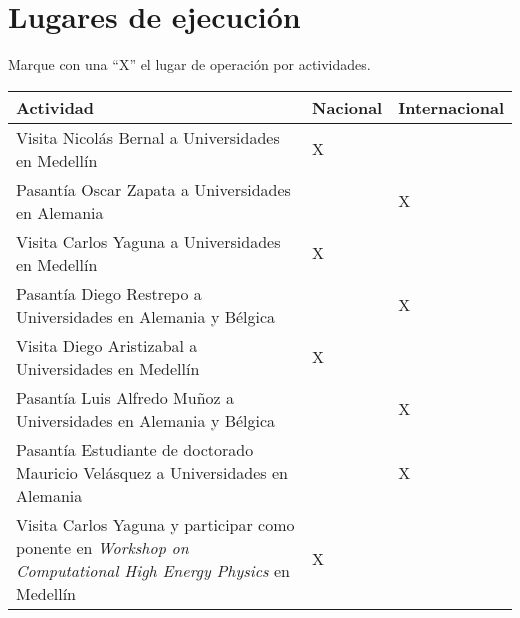 
\section{Lugares de ejecución}
\begin{instrucciones}
Marque con una “X” el lugar de operación por actividades.  
\end{instrucciones}

\begin{tabular}{|p{10cm}|l|l|}\hline
  Actividad                           & Nacional & Internacional \\\hline
Visita Nicolás Bernal a Universidades 
en Medellín                           & X        &               \\\hline
Pasantía Oscar Zapata a Universidades 
en Alemania                           &          & X             \\\hline
Visita Carlos Yaguna a Universidades 
en Medellín                           & X        &               \\\hline
Pasantía Diego Restrepo a Universidades 
en Alemania y Bélgica                 &          & X             \\\hline
Visita Diego Aristizabal a Universidades 
en Medellín                           & X        &               \\\hline
Pasantía Luis Alfredo Muñoz a Universidades 
en Alemania y Bélgica                 &          & X             \\\hline
Pasantía Estudiante de doctorado  
Mauricio Velásquez a Universidades 
en Alemania                           &          & X             \\\hline
Visita Carlos Yaguna y participar como 
ponente en 
\emph{Workshop on Computational High Energy Physics}
en Medellín                          & X        &               \\\hline
\end{tabular}


